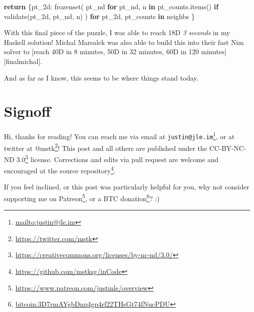 \documentclass[]{article}
\newenvironment{Shaded}{}{}
\newcommand{\BuiltInTok}[1]{#1}
\newcommand{\ControlFlowTok}[1]{\textcolor[rgb]{0.00,0.44,0.13}{\textbf{#1}}}
\newcommand{\KeywordTok}[1]{\textcolor[rgb]{0.00,0.44,0.13}{\textbf{#1}}}
\newcommand{\NormalTok}[1]{#1}
\renewcommand{\href}[2]{#2\footnote{\url{#1}}}
\begin{document}
\begin{Shaded}
\begin{Highlighting}[]
    \ControlFlowTok{return}\NormalTok{ \{pt\_2d: }\BuiltInTok{frozenset}\NormalTok{(}
\NormalTok{                       pt\_nd }\ControlFlowTok{for}\NormalTok{ pt\_nd, n }\KeywordTok{in}\NormalTok{ pt\_counts.items()}
                             \ControlFlowTok{if}\NormalTok{ validate(pt\_2d, pt\_nd, n)}
\NormalTok{                   )}
              \ControlFlowTok{for}\NormalTok{ pt\_2d, pt\_counts }\KeywordTok{in}\NormalTok{ neighbs}
\NormalTok{           \}}
\end{Highlighting}
\end{Shaded}

With this final piece of the puzzle, I was able to reach 18D \emph{3 seconds} in
my Haskell solution! Michal Marsalek was also able to build this into their fast
Nim solver to {[}reach 40D in 8 minutes, 50D in 32 minutes, 60D in 120
minutes{]}{[}finalmichal{]}.

And as far as I know, this seems to be where things stand today.

\hypertarget{signoff}{%
\section{Signoff}\label{signoff}}

Hi, thanks for reading! You can reach me via email at
\href{mailto:justin@jle.im}{\nolinkurl{justin@jle.im}}, or at twitter at
\href{https://twitter.com/mstk}{@mstk}! This post and all others are published
under the \href{https://creativecommons.org/licenses/by-nc-nd/3.0/}{CC-BY-NC-ND
3.0} license. Corrections and edits via pull request are welcome and encouraged
at \href{https://github.com/mstksg/inCode}{the source repository}.

If you feel inclined, or this post was particularly helpful for you, why not
consider \href{https://www.patreon.com/justinle/overview}{supporting me on
Patreon}, or a \href{bitcoin:3D7rmAYgbDnp4gp4rf22THsGt74fNucPDU}{BTC donation}?
:)
\end{document}
